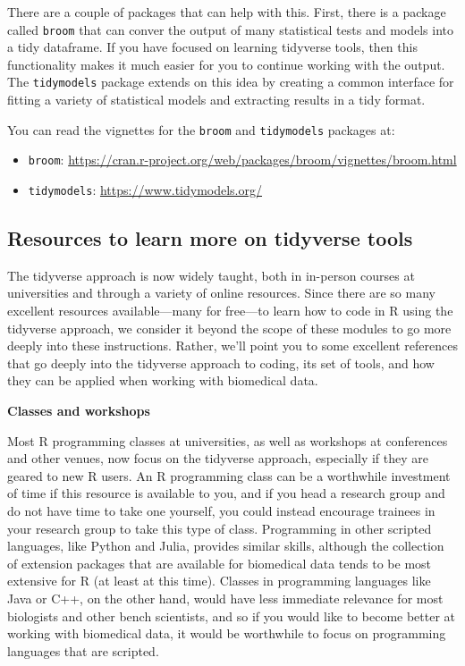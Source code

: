 \documentclass[]{tufte-book}
\providecommand{\tightlist}{%
  \setlength{\itemsep}{0pt}\setlength{\parskip}{0pt}}
\begin{document}
There are a couple of packages that can help with this. First, there is a
package called \texttt{broom} that can conver the output of many statistical
tests and models into a tidy dataframe. If you have focused on learning
tidyverse tools, then this functionality makes it much easier for you to
continue working with the output. The \texttt{tidymodels}
package extends on this idea by creating a common interface for fitting
a variety of statistical models and extracting results in a tidy format.

You can read the vignettes for the \texttt{broom} and \texttt{tidymodels} packages at:

\begin{itemize}
\tightlist
\item
  \texttt{broom}: \url{https://cran.r-project.org/web/packages/broom/vignettes/broom.html}
\item
  \texttt{tidymodels}: \url{https://www.tidymodels.org/}
\end{itemize}

\subsection{Resources to learn more on tidyverse tools}\label{resources-to-learn-more-on-tidyverse-tools}

The tidyverse approach is now widely taught, both in in-person courses at
universities and through a variety of online resources.
Since there are so many excellent resources available---many for free---to learn
how to code in R using the tidyverse approach, we consider it beyond the scope
of these modules to go more deeply into these instructions. Rather, we'll
point you to some excellent references that go deeply into the tidyverse
approach to coding, its set of tools, and how they can be applied when
working with biomedical data.

\textbf{Classes and workshops}

Most R programming classes at universities, as well as workshops at conferences
and other venues, now focus on the tidyverse approach, especially if they are
geared to new R users. An R programming class can be a worthwhile investment of
time if this resource is available to you, and if you head a research group and
do not have time to take one yourself, you could instead encourage
trainees in your research group to take this type of class. Programming in other
scripted languages, like Python and Julia, provides similar skills, although the
collection of extension packages that are available for biomedical data tends to
be most extensive for R (at least at this time). Classes in programming
languages like Java or C++, on the other hand, would have less immediate
relevance for most biologists and other bench scientists, and so if you would
like to become better at working with biomedical data, it would be worthwhile to
focus on programming languages that are scripted.
\end{document}
